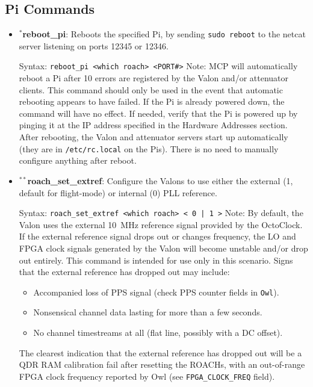 \subsection{Pi Commands}
\begin{itemize}[leftmargin=*,label={}]

\item $^{*}$\textbf{reboot\_pi}: Reboots the specified Pi, by sending \texttt{sudo reboot} to the netcat server listening on ports 12345 or 12346.

Syntax: \texttt{reboot\_pi <which roach> <PORT\#>}
Note: MCP will automatically reboot a Pi after 10 errors are registered by the Valon and/or attenuator clients. This command should only be used in the event that automatic rebooting appears to have failed. If the Pi is already powered down, the command will have no effect. If needed, verify that the Pi is powered up by pinging it at the IP address specified in the Hardware Addresses section. After rebooting, the Valon and attenuator servers start up automatically (they are in \texttt{/etc/rc.local} on the Pis). There is no need to manually configure anything after reboot.

\item $^{**}$\textbf{roach\_set\_extref}: Configure the Valons to use either the external (1, default for flight-mode) or internal (0) PLL reference.

Syntax: \texttt{roach\_set\_extref <which roach> < 0 | 1 >}
Note: By default, the Valon uses the external 10~MHz reference signal provided by the OctoClock. If the external reference signal drops out or changes frequency, the LO and FPGA clock signals generated by the Valon will become unstable and/or drop out entirely. This command is intended for use only in this scenario. Signs that the external reference has dropped out may include:
\begin{itemize}
  \item Accompanied loss of PPS signal (check PPS counter fields in \texttt{Owl}).
  \item Nonsensical channel data lasting for more than a few seconds.
  \item No channel timestreams at all (flat line, possibly with a DC offset).
\end{itemize}
The clearest indication that the external reference has dropped out will be a QDR RAM calibration fail after resetting the ROACHs, with an out-of-range FPGA clock frequency reported by Owl (see \texttt{FPGA\_CLOCK\_FREQ} field).


\end{itemize}
